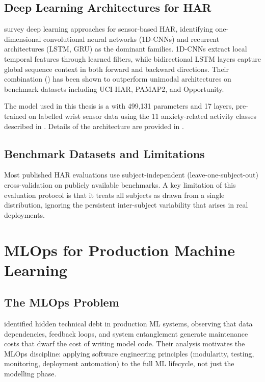 \subsection{Deep Learning Architectures for HAR}

\citet{chen2021deep} survey deep learning approaches for sensor-based HAR,
identifying one-dimensional convolutional neural networks (1D-CNNs) and
recurrent architectures (LSTM, GRU) as the dominant families.
1D-CNNs extract local temporal features through learned filters, while
bidirectional LSTM layers capture global sequence context in both forward and
backward directions.
Their combination (\cnnbilstm{}) has been shown to outperform unimodal
architectures on benchmark datasets including UCI-HAR, PAMAP2, and
Opportunity.

The model used in this thesis is a \cnnbilstm{} with 499,131 parameters and
17 layers, pre-trained on labelled wrist sensor data using the 11 anxiety-related
activity classes described in .
Details of the architecture are provided in .

\subsection{Benchmark Datasets and Limitations}

Most published HAR evaluations use subject-independent (leave-one-subject-out)
cross-validation on publicly available benchmarks.
A key limitation of this evaluation protocol is that it treats all subjects as
drawn from a single distribution, ignoring the persistent inter-subject
variability that arises in real deployments.

\section{MLOps for Production Machine Learning}
\label{sec:bg_mlops}

\subsection{The MLOps Problem}

\citet{sculley2015hidden} identified hidden technical debt in production ML
systems, observing that data dependencies, feedback loops, and system
entanglement generate maintenance costs that dwarf the cost of writing model
code.
Their analysis motivates the MLOps discipline: applying software engineering
principles (modularity, testing, monitoring, deployment automation) to the full
ML lifecycle, not just the modelling phase.

